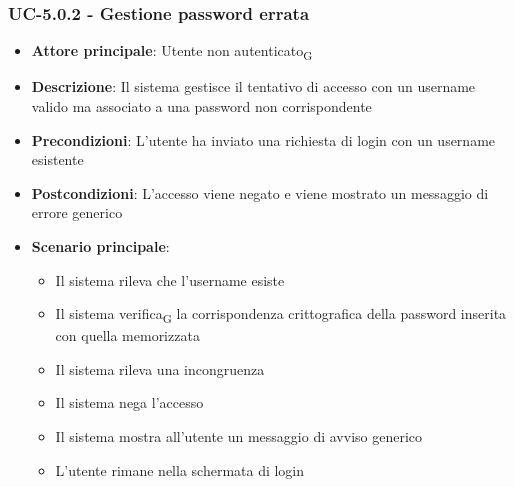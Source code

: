 \documentclass[11pt,a4paper]{article}
\newcommand{\gls}[1]{#1\textsubscript{G}}
\begin{document}
\subsubsection{UC-5.0.2 - Gestione password errata}
\begin{itemize}
    \item \textbf{Attore principale}: \gls{Utente non autenticato}
    \item \textbf{Descrizione}: Il sistema gestisce il tentativo di accesso con un username valido ma associato a una password non corrispondente
    \item \textbf{Precondizioni}: L’utente ha inviato una richiesta di login con un username esistente
    \item \textbf{Postcondizioni}: L’accesso viene negato e viene mostrato un messaggio di errore generico
    \item \textbf{Scenario principale}:
    \begin{itemize}
        \item Il sistema rileva che l'username esiste
        \item Il sistema \gls{verifica} la corrispondenza crittografica della password inserita con quella memorizzata
        \item Il sistema rileva una incongruenza
        \item Il sistema nega l'accesso
        \item Il sistema mostra all’utente un messaggio di avviso generico
        \item L'utente rimane nella schermata di login
    \end{itemize}
\end{itemize}
\end{document}
